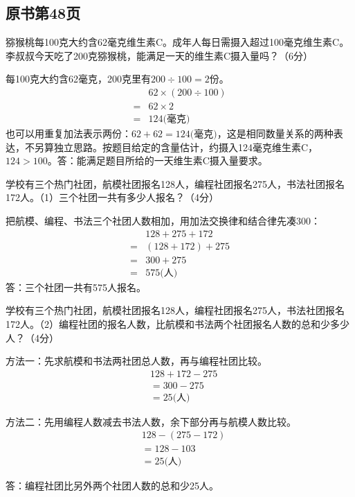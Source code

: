 
\subsection*{原书第48页}

猕猴桃每100克大约含62毫克维生素C。成年人每日需摄入超过100毫克维生素C。李叔叔今天吃了200克猕猴桃，能满足一天的维生素C摄入量吗？（6分）\par
\begin{BookAnswer}
每100克大约含62毫克，200克里有\(200\div100=2\)份。\[\begin{aligned}&62\times(200\div100)\\={}&62\times2\\={}&124\text{(毫克)}\end{aligned}\]也可以用重复加法表示两份：\(62+62=124\text{(毫克)}\)，这是相同数量关系的两种表达，不另算独立思路。按题目给定的含量估计，约摄入124毫克维生素C，\allowbreak{}\(124>100\)。答：能满足题目所给的一天维生素C摄入量要求。
\end{BookAnswer}

学校有三个热门社团，航模社团报名128人，编程社团报名275人，书法社团报名172人。（1）三个社团一共有多少人报名？（4分）\par
\begin{BookAnswer}
把航模、编程、书法三个社团人数相加，用加法交换律和结合律先凑300：\[\begin{aligned}&128+275+172\\={}&(128+172)+275\\={}&300+275\\={}&575\text{(人)}\end{aligned}\]答：三个社团一共有575人报名。
\end{BookAnswer}

学校有三个热门社团，航模社团报名128人，编程社团报名275人，书法社团报名172人。（2）编程社团的报名人数，比航模和书法两个社团报名人数的总和少多少人？（4分）\par
\begin{BookAnswer}
方法一：先求航模和书法两社团总人数，再与编程社团比较。\[\begin{aligned}&128+172-275\\&=300-275\\&=25\text{(人)}\end{aligned}\]\par 方法二：先用编程人数减去书法人数，余下部分再与航模人数比较。\[\begin{aligned}&128-(275-172)\\&=128-103\\&=25\text{(人)}\end{aligned}\]\par 答：编程社团比另外两个社团人数的总和少25人。
\end{BookAnswer}

